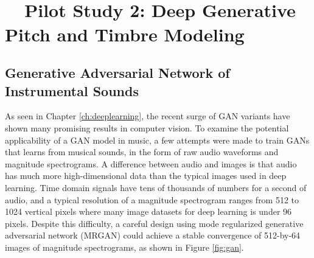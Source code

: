 
\graphicspath{{6-pilot/figures/}}

\newcommand\secondpilottitle{ Deep Generative Pitch and Timbre Modeling }
\chapter[Pilot Study 2: \newline \secondpilottitle]{~~~~~~~~~~~~~~~~~~~~~~~~~~~~~~~~~Pilot Study 2: \newline\vspace{-0.5em}\newline \secondpilottitle}
\label{ch:pilot2}


\section{Generative Adversarial Network of Instrumental Sounds}


As seen in Chapter \ref{ch:deeplearning}, the recent surge of GAN variants have shown many promising results in computer vision.
To examine the potential applicability of a GAN model in music, a few attempts were made to train GANs that learns from musical sounds, in the form of raw audio waveforms and magnitude spectrograms.
A difference between audio and images is that audio has much more high-dimensional data than the typical images used in deep learning.
Time domain signals have tens of thousands of numbers for a second of audio, and a typical resolution of a magnitude spectrogram ranges from 512 to 1024 vertical pixels where many image datasets for deep learning is under 96 pixels.
Despite this difficulty, a careful design using mode regularized generative adversarial network (MRGAN) \cite{che2016mrgan} could achieve a stable convergence of 512-by-64 images of magnitude spectrograms, as shown in Figure \ref{fig:gan}.

